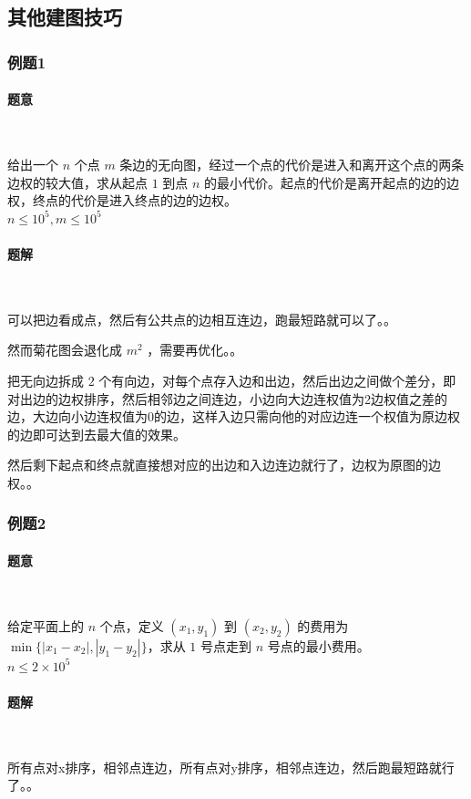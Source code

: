 	\newpage
	\subsection{其他建图技巧}
	\subsubsection{例题1}
	\paragraph{题意}~
	
	给出一个 $n$ 个点 $m$ 条边的无向图，经过一个点的代价是进入和离开这个点的两条边权的较大值，求从起点 $1$ 到点 $n$ 的最小代价。起点的代价是离开起点的边的边权，终点的代价是进入终点的边的边权。\\
	$n\le10^5,m\le10^5$
	\paragraph{题解}~
	
	可以把边看成点，然后有公共点的边相互连边，跑最短路就可以了。。
	
	然而菊花图会退化成 $m^2$ ，需要再优化。。
	
	把无向边拆成 $2$ 个有向边，对每个点存入边和出边，然后出边之间做个差分，即对出边的边权排序，然后相邻边之间连边，小边向大边连权值为2边权值之差的边，大边向小边连权值为0的边，这样入边只需向他的对应边连一个权值为原边权的边即可达到去最大值的效果。
	
	然后剩下起点和终点就直接想对应的出边和入边连边就行了，边权为原图的边权。。\\
	\subsubsection{例题2}
	\paragraph{题意}~
	
	给定平面上的 $n$ 个点，定义 $(x_1,y_1)$ 到 $(x_2,y_2)$ 的费用为 $\min\{|x_1-x_2|,|y_1-y_2|\}$，求从 $1$ 号点走到 $n$ 号点的最小费用。\\
	$n\le2\times10^5$
	\paragraph{题解}~
	
	所有点对x排序，相邻点连边，所有点对y排序，相邻点连边，然后跑最短路就行了。。\\
